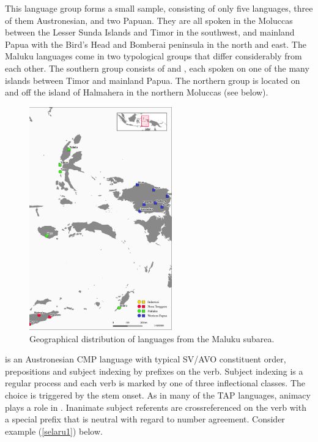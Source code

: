 This language group forms a small sample, consisting of only five languages, three of them Austronesian, and two Papuan. They are all spoken in the Moluccas between the Lesser Sunda Islands and Timor in the southwest, and mainland Papua with the Bird's Head and Bomberai peninsula in the north and east. The Maluku languages come in two typological groups that differ considerably from each other. The southern group consists of  and , each spoken on one of the many islands between Timor and mainland Papua. The northern group is located on and off the island of Halmahera in the northern Moluccas (see  below).

\begin{figure}

\includegraphics[width=0.55\textwidth]{figures/languages_Maluku.pdf}
\caption{Geographical distribution of languages from the Maluku subarea.}\label{map:Mal}

\end{figure}

 is an Austronesian CMP language with typical SV/AVO constituent order, prepositions and subject indexing by prefixes on the verb. Subject indexing is a regular process and each verb is marked by one of three inflectional classes. The choice is triggered by the stem onset. As in many of the TAP languages, animacy plays a role in . Inanimate subject referents are crossreferenced on the verb with a special prefix that is neutral with regard to number agreement. Consider example (\ref{selaru1}) below.


